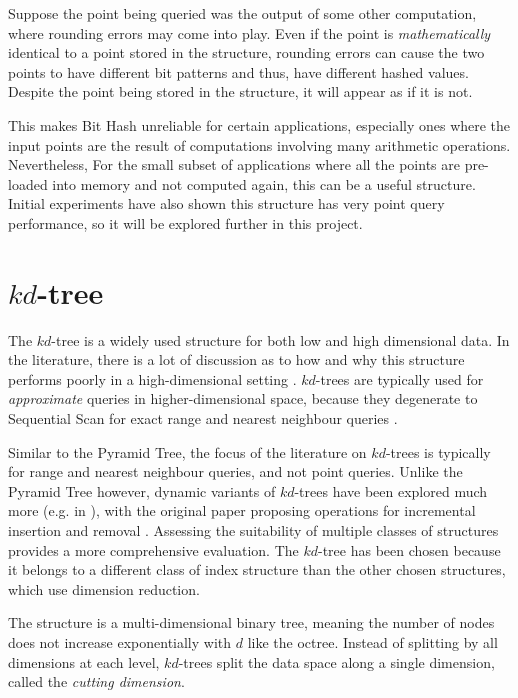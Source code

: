Suppose the point being queried was the output of some other computation, where rounding errors may come into play. Even if the point is \textit{mathematically} identical to a point stored in the structure, rounding errors can cause the two points to have different bit patterns and thus, have different hashed values.  Despite the point being stored in the structure, it will appear as if it is not. 

This makes Bit Hash unreliable for certain applications, especially ones where the input points are the result of computations involving many arithmetic operations. Nevertheless, For the small subset of applications where all the points are pre-loaded into memory and not computed again, this can be a useful structure. Initial experiments have also shown this structure has very point query performance, so it will be explored further in this project.

\section{$kd$-tree}
\label{sec:kd-tree-detail}

The $kd$-tree is a widely used structure for both low and high dimensional data. In the literature, there is a lot of discussion as to how and why this structure performs poorly in a high-dimensional setting \cite{highd-nn, search-highd-analysis}. $kd$-trees are typically used for \textit{approximate} queries in higher-dimensional space, because they degenerate to Sequential Scan for exact range and nearest neighbour queries \cite{similarity-searching}. 

Similar to the Pyramid Tree, the focus of the literature on $kd$-trees is typically for range and nearest neighbour queries, and not point queries. Unlike the Pyramid Tree however, dynamic variants of $kd$-trees have been explored much more (e.g. in \cite{bkd-tree, kdb-tree}), with the original paper proposing operations for incremental insertion and removal \cite{kd-tree}. Assessing the suitability of multiple classes of structures provides a more comprehensive evaluation. The $kd$-tree has been chosen because it belongs to a different class of index structure than the other chosen structures, which use dimension reduction.

The structure is a multi-dimensional binary tree, meaning the number of nodes does not increase exponentially with $d$ like the octree. Instead of splitting by all dimensions at each level, $kd$-trees split the data space along a single dimension, called the \textit{cutting dimension}.

